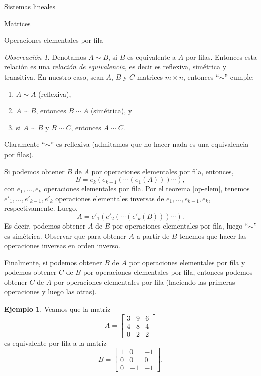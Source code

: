 \documentclass[a4paper,12pt,twoside,spanish,reqno]{amsbook}
\theoremstyle{definition}
\newtheorem{ejemplo}{Ejemplo}[section]
\theoremstyle{remark}
\newtheorem{obs}{Observaci\'on}[section]
\begin{document}
\begin{chapter}{Sistemas lineales}
\begin{section}{Matrices}
\begin{subsection}{Operaciones elementales por fila}
				\begin{obs} Denotamos $A \sim B$, si $B$ es equivalente a $A$ por filas. Entonces esta relación es una \textit{relación de equivalencia}, es decir es reflexiva, simétrica y transitiva. En  nuestro caso, sean $A$, $B$ y $C$ matrices $m \times n$, entonces ``$\sim$'' cumple: 
					\begin{enumerate}
						\item  $A \sim A$ (reflexiva), 
						\item $A \sim B$, entonces $B \sim A$ (simétrica), y
						\item si $A \sim B$ y $B \sim C$, entonces $A \sim C$.   
					\end{enumerate}
					Claramente ``$\sim$'' es reflexiva (admitamos que no hacer nada es una equivalencia por filas). 
					
					Si podemos obtener $B$ de $A$ por operaciones elementales por fila, entonces, 
					$$
					B = e_k(e_{k-1}(\cdots(e_1(A)))\cdots),
					$$
					con $e_1,\ldots,e_k$ operaciones elementales por fila. Por el teorema \ref{op-elem},  tenemos $e'_1,\ldots,e'_{k-1},e'_k$ operaciones elementales inversas de  $e_1,\ldots,e_{k-1},e_k$, respectivamente. Luego, 
					$$
					A = e'_1(e'_{2}(\cdots(e'_k(B)))\cdots).
					$$
					Es decir, podemos  obtener $A$ de $B$ por operaciones elementales por fila, luego ``$\sim$'' es simétrica. Observar que para obtener $A$ a partir de $B$ tenemos que hacer las operaciones inversas en orden inverso. 
					
					Finalmente,   si podemos obtener $B$ de $A$ por operaciones elementales por fila y  podemos obtener $C$ de $B$ por operaciones elementales por fila, entonces podemos obtener $C$ de $A$ por operaciones elementales por fila (haciendo las primeras operaciones y luego las otras).
				\end{obs}
				
				\begin{ejemplo}
					Veamos que la matriz 
					\begin{equation*}
					A= 	\begin{bmatrix}
					3 & 9 & 6 \\ 4&8&4 \\ 0&2&2
					\end{bmatrix}
					\end{equation*}
					es equivalente por fila a la matriz
					\begin{equation*}
					B = \begin{bmatrix}
					1&0&-1 \\ 0&0&0\\  0&-1&-1
					\end{bmatrix}.
					\end{equation*}
						\end{ejemplo}
					

\end{subsection}
\end{section}
\end{chapter}
\end{document}
